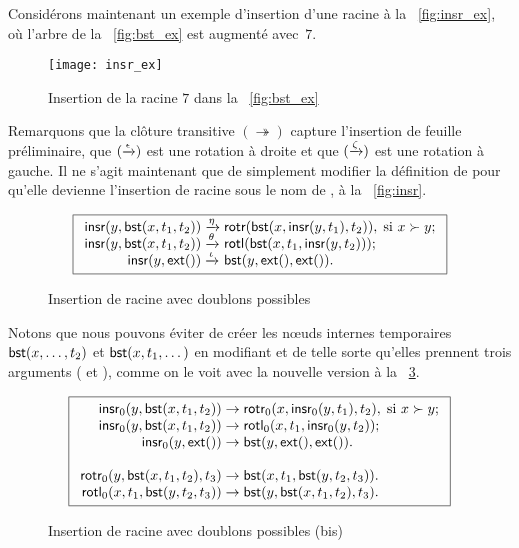 Considérons maintenant un exemple d'insertion d'une racine à la
\fig~\vref{fig:insr_ex}, où l'arbre de la \fig~\vref{fig:bst_ex} est
augmenté avec~\(7\).
\begin{figure}
\centering
\texttt{[image: insr\_ex]}%
\caption{Insertion de la racine \(7\) dans la \fig~\vref{fig:bst_ex}
\label{fig:insr_ex}}
\end{figure}
Remarquons que la clôture transitive \((\twoheadrightarrow)\) capture
l'insertion de feuille préliminaire, que
\((\xrightarrow{\smash{\epsilon}})\) est une rotation à droite et que
\((\xrightarrow{\smash{\zeta}})\) est une rotation à gauche. Il ne
s'agit maintenant que de simplement modifier la définition de
 pour qu'elle devienne l'insertion de racine sous le nom
de , à la \fig~\vref{fig:insr}.
\begin{figure}
\begin{equation*}
\boxed{
\begin{array}{r@{\;}l@{\;}l}
\fun{insr}(y,\fun{bst}(x,t_1,t_2)) & \xrightarrow{\smash{\eta}} &
  \fun{rotr}(\fun{bst}(x,\fun{insr}(y,t_1),t_2)),
  \; \text{si \(x \succ y\)};\\
\fun{insr}(y,\fun{bst}(x,t_1,t_2)) & \xrightarrow{\smash{\theta}} &
  \fun{rotl}(\fun{bst}(x,t_1,\fun{insr}(y,t_2)));\\
\fun{insr}(y,\fun{ext}()) & \xrightarrow{\smash{\iota}} & \fun{bst}(y,\fun{ext}(),\fun{ext}()).
\end{array}}
\end{equation*}
\caption{Insertion de racine avec doublons possibles\label{fig:insr}}
\end{figure}
Notons que nous pouvons éviter de créer les n{\oe}uds internes
temporaires \(\textsf{bst}(x,\dots,t_2)\) et \(\textsf{bst}(x,t_1,\dots)\)
en modifiant  et  de telle sorte qu'elles
prennent trois arguments ( et ),
comme on le voit avec la nouvelle version  à la
\fig~\ref{fig:insr0}.
\begin{figure}[b]
\begin{equation*}
\boxed{
\begin{array}{r@{\;}l@{\;}l}
\fun{insr}_0(y,\fun{bst}(x,t_1,t_2)) & \rightarrow &
  \fun{rotr}_0(x,\fun{insr}_0(y,t_1),t_2),
  \; \text{si \(x \succ y\)};\\
\fun{insr}_0(y,\fun{bst}(x,t_1,t_2)) & \rightarrow &
  \fun{rotl}_0(x,t_1,\fun{insr}_0(y,t_2));\\
\fun{insr}_0(y,\fun{ext}()) & \rightarrow &
\fun{bst}(y,\fun{ext}(),\fun{ext}()).\\
\\
\fun{rotr}_0(y,\fun{bst}(x,t_1,t_2),t_3)
& \rightarrow & \fun{bst}(x,t_1,\fun{bst}(y,t_2,t_3)).\\
\fun{rotl}_0(x,t_1,\fun{bst}(y,t_2,t_3))
& \rightarrow & \fun{bst}(y,\fun{bst}(x,t_1,t_2),t_3).
\end{array}}
\end{equation*}
\caption{Insertion de racine avec doublons possibles (bis)\label{fig:insr0}}
\end{figure}

